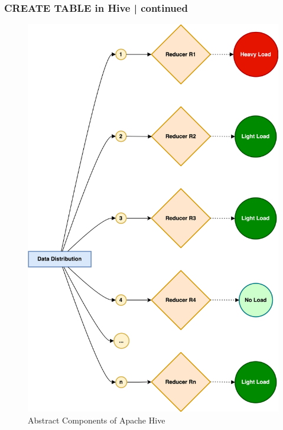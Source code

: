 		\begin{frame}
			\frametitle{CREATE TABLE in Hive | continued}  
			\vspace{-0.5cm}		
			\begin{tcolorbox}[colback=white,colframe=black,title= Part 10: Data Skewing]	
				\vspace{-0.3cm}
				\begin{figure}
					\includegraphics[width=\textwidth,height=.7\textheight,keepaspectratio]{./Figures/chapter-03/dwh_hive-skweed_dt_mr_2.png}	
					\caption{Abstract Components of Apache Hive}
				\end{figure}
				\vspace{-0.3cm}
			\end{tcolorbox}
		\end{frame}		

